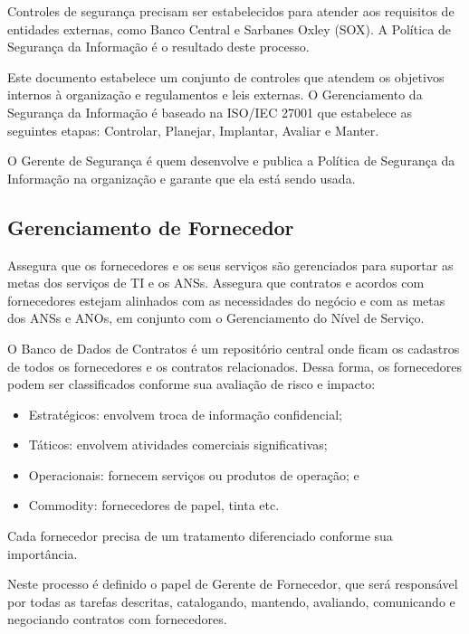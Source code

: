 Controles de segurança precisam ser estabelecidos para atender aos requisitos
de entidades externas, como Banco Central e Sarbanes Oxley (SOX). A Política de
Segurança da Informação é o resultado deste processo.

Este documento estabelece um conjunto de controles que atendem os objetivos
internos à organização e regulamentos e leis externas. O Gerenciamento da
Segurança da Informação é baseado na ISO/IEC 27001 que estabelece as seguintes
etapas: Controlar, Planejar, Implantar, Avaliar e Manter.

O Gerente de Segurança é quem desenvolve e publica a Política de Segurança da
Informação na organização e garante que ela está sendo usada.


\subsection{Gerenciamento de Fornecedor}
Assegura que os fornecedores e os seus serviços são gerenciados para suportar
as metas dos serviços de TI e os ANSs. Assegura que contratos e acordos com
fornecedores estejam alinhados com as necessidades do negócio e com as metas
dos ANSs e ANOs, em conjunto com o Gerenciamento do Nível de Serviço.

O Banco de Dados de Contratos é um repositório central onde ficam os cadastros
de todos os fornecedores e os contratos relacionados. Dessa forma, os
fornecedores podem ser classificados conforme sua avaliação de risco e impacto:
\begin{itemize}
    \item Estratégicos: envolvem troca de informação confidencial;
    \item Táticos: envolvem atividades comerciais significativas;
    \item Operacionais: fornecem serviços ou produtos de operação; e
    \item Commodity: fornecedores de papel, tinta etc.
\end{itemize}

Cada fornecedor precisa de um tratamento diferenciado conforme sua importância.

Neste processo é definido o papel de Gerente de Fornecedor, que será
responsável por todas as tarefas descritas, catalogando, mantendo, avaliando,
comunicando e negociando contratos com fornecedores.


